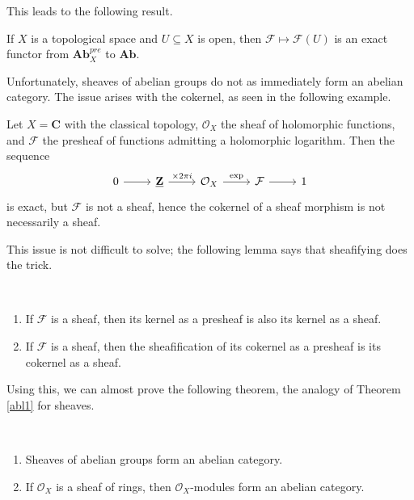 \documentclass[11pt,openany]{book} %
\newcommand{\Z}{\mathbf{Z}}
\newcommand{\C}{\mathbf{C}}
\begin{document}
This leads to the following result.\\
\begin{proposition}
If $X$ is a topological space and $U \subseteq X$ is open, then $\mathcal{F} \mapsto \mathcal{F}(U)$ is an exact functor from $\mathbf{Ab}_X^{pre}$ to $\mathbf{Ab}$.
\end{proposition}
\medskip

Unfortunately, sheaves of abelian groups do not as immediately form an abelian category. The issue arises with the cokernel, as seen in the following example.\\

\begin{example}
Let $X = \C$ with the classical topology, $\mathcal{O}_X$ the sheaf of holomorphic functions, and $\mathcal{F}$ the presheaf of functions admitting a holomorphic logarithm. Then the sequence
\[
\begin{tikzcd}
0 \ar[r] & \underline{\Z} \ar[r, "\times 2 \pi i"] & \mathcal{O}_X \ar[r, "\operatorname{exp}"] & \mathcal{F} \ar[r] & 1
\end{tikzcd}
\]
is exact, but $\mathcal{F}$ is not a sheaf, hence the cokernel of a sheaf morphism is not necessarily a sheaf.
\end{example}

This issue is not difficult to solve; the following lemma says that sheafifying does the trick.\\

\begin{lemma}\
\begin{enumerate}[label=$\blacktriangleright$]
	\item If $\mathcal{F}$ is a sheaf, then its kernel as a presheaf is also its kernel as a sheaf.

	\item If $\mathcal{F}$ is a sheaf, then the sheafification of its cokernel as a presheaf is its cokernel as a sheaf.
\end{enumerate}
\end{lemma}
\medskip

Using this, we can almost prove the following theorem, the analogy of Theorem \ref{abl1} for sheaves.\\

\begin{theorem}\ \label{abl2}
\begin{enumerate}[label=$\blacktriangleright$]
	\item Sheaves of abelian groups form an abelian category.
    \item If $\mathcal{O}_X$ is a sheaf of rings, then $\mathcal{O}_X$-modules form an abelian category.
\end{enumerate}
\end{theorem}
\end{document}

